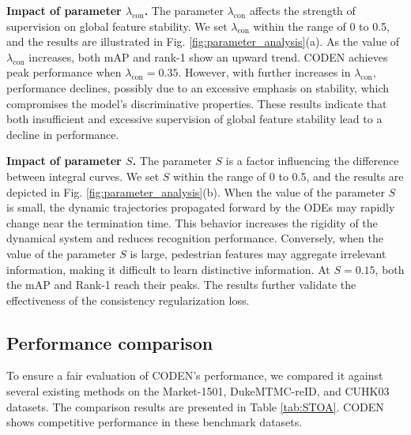 \documentclass[12pt]{spieman}  %
\begin{document}
\begin{spacing}{2}
		\textbf{Impact of parameter  $\lambda_{\text {con}}$.} The parameter $\lambda_{\text {con}}$ affects the strength of supervision on global feature stability. We set $\lambda_{\text {con}}$ within the range of 0 to 0.5, and the results are illustrated in Fig. \ref{fig:parameter_analysis}(a). As the value of $\lambda_{\text {con}}$ increases, both mAP and rank-1 show an upward trend. CODEN achieves peak performance when $\lambda_{\text {con}} = 0.35$. However, with further increases in $\lambda_{\text {con}}$, performance declines, possibly due to an excessive emphasis on stability, which compromises the model’s discriminative properties. These results indicate that both insufficient and excessive supervision of global feature stability lead to a decline in performance.
		
		\textbf{Impact of parameter $S$.} The parameter $S$ is a factor influencing the difference between integral curves. We set $S$ within the range of 0 to 0.5, and the results are depicted in Fig. \ref{fig:parameter_analysis}(b). When the value of the parameter $S$ is small, the dynamic trajectories propagated forward by the ODEs may rapidly change near the termination time. This behavior increases the rigidity of the dynamical system and reduces recognition performance. Conversely, when the value of the parameter $S$ is large, pedestrian features may aggregate irrelevant information, making it difficult to learn distinctive information. At $S=0.15$, both the mAP and Rank-1 reach their peaks. The results further validate the effectiveness of the consistency regularization loss.
		
		\subsection{Performance comparison}
		To ensure a fair evaluation of CODEN's performance, we compared it against several existing methods on the Market-1501, DukeMTMC-reID, and CUHK03 datasets. The comparison results are presented in Table \ref{tab:STOA}. CODEN shows competitive performance in these benchmark datasets.
		

\end{spacing}
\end{document}
